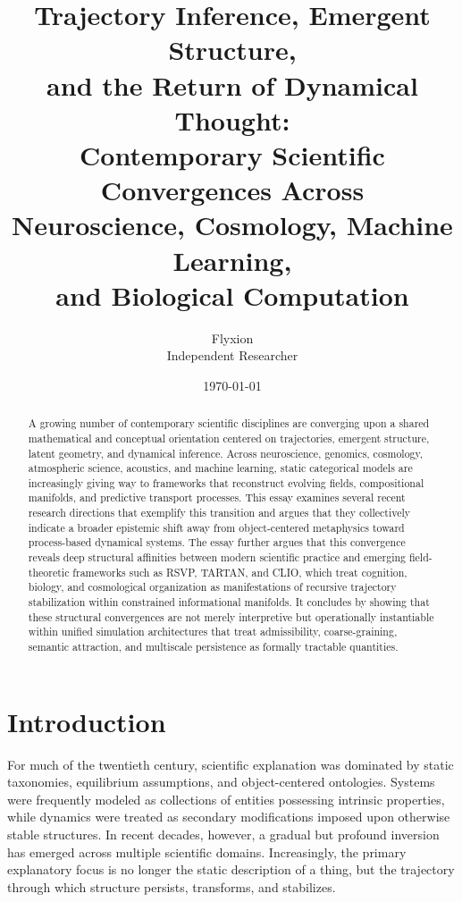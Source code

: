 \documentclass[12pt,a4paper]{article}
\title{
\large\textbf{
Trajectory Inference, Emergent Structure,\\
and the Return of Dynamical Thought:\\
Contemporary Scientific Convergences Across\\
Neuroscience, Cosmology, Machine Learning,\\
and Biological Computation
}
}
\author{
Flyxion\\
\small Independent Researcher
}
\date{\today}
\begin{document}
\maketitle

\begin{abstract}
A growing number of contemporary scientific disciplines are converging upon a shared
mathematical and conceptual orientation centered on trajectories, emergent structure,
latent geometry, and dynamical inference. Across neuroscience, genomics, cosmology,
atmospheric science, acoustics, and machine learning, static categorical models are
increasingly giving way to frameworks that reconstruct evolving fields, compositional
manifolds, and predictive transport processes. This essay examines several recent
research directions that exemplify this transition and argues that they collectively
indicate a broader epistemic shift away from object-centered metaphysics toward
process-based dynamical systems. The essay further argues that this convergence
reveals deep structural affinities between modern scientific practice and emerging
field-theoretic frameworks such as RSVP, TARTAN, and CLIO, which treat cognition,
biology, and cosmological organization as manifestations of recursive trajectory
stabilization within constrained informational manifolds. It concludes by showing
that these structural convergences are not merely interpretive but operationally
instantiable within unified simulation architectures that treat admissibility,
coarse-graining, semantic attraction, and multiscale persistence as formally
tractable quantities.
\end{abstract}

\newpage

\section{Introduction}

For much of the twentieth century, scientific explanation was dominated by static
taxonomies, equilibrium assumptions, and object-centered ontologies. Systems were
frequently modeled as collections of entities possessing intrinsic properties, while
dynamics were treated as secondary modifications imposed upon otherwise stable
structures. In recent decades, however, a gradual but profound inversion has emerged
across multiple scientific domains. Increasingly, the primary explanatory focus is
no longer the static description of a thing, but the trajectory through which
structure persists, transforms, and stabilizes.
\end{document}
